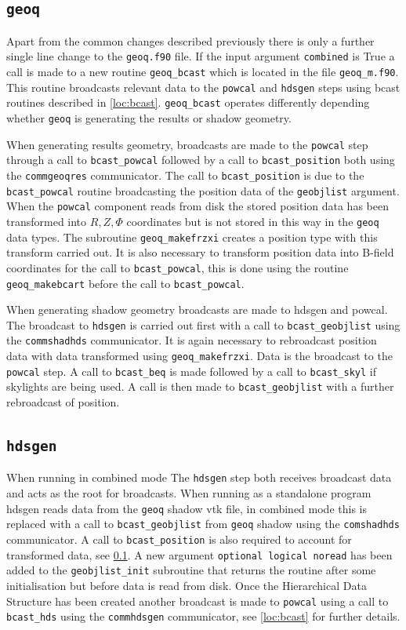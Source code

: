 \subsection{\tt geoq}
\label{loc:geoq}
Apart from the common changes described previously there is only a further single line change to the {\tt geoq.f90} file. If the input argument {\tt combined} is True a call is made to a new routine {\tt geoq\_bcast} which is located in the file {\tt geoq\_m.f90}. This routine broadcasts relevant data to the {\tt powcal} and {\tt hdsgen} steps using bcast routines described in \ref{loc:bcast}. {\tt geoq\_bcast} operates differently depending whether {\tt geoq} is generating the results or shadow geometry.

When generating results geometry, broadcasts are made to the {\tt powcal} step through a call to {\tt bcast\_powcal} followed by a call to {\tt bcast\_position} both using the {\tt commgeoqres} communicator. The call to {\tt bcast\_position} is due to the {\tt bcast\_powcal} routine broadcasting the position data of the {\tt geobjlist} argument. When the {\tt powcal} component reads from disk the stored position data has been transformed into $R,Z,\Phi$ coordinates but is not stored in this way in the {\tt geoq} data types. The subroutine {\tt geoq\_makefrzxi} creates a position type with this transform carried out. It is also necessary to transform position data into B-field coordinates for the call to {\tt bcast\_powcal}, this is done using the routine {\tt geoq\_makebcart} before the call to {\tt bcast\_powcal}.

When generating shadow geometry broadcasts are made to hdsgen and powcal. The broadcast to {\tt hdsgen} is carried out first with a call to {\tt bcast\_geobjlist} using the {\tt commshadhds} communicator. It is again necessary to rebroadcast position data with data transformed using {\tt geoq\_makefrzxi}. Data is the broadcast to the {\tt powcal} step. A call to {\tt bcast\_beq} is made followed by a call to {\tt bcast\_skyl} if skylights are being used. A call is then made to {\tt bcast\_geobjlist} with a further rebroadcast of position.


\subsection{\tt hdsgen}
When running in combined mode The {\tt hdsgen} step both receives broadcast data and acts as the root for broadcasts. When running as a standalone program hdsgen reads data from the {\tt geoq} shadow vtk file, in combined mode this is replaced with a call to {\tt bcast\_geobjlist} from {\tt geoq} shadow using the {\tt comshadhds} communicator. A call to {\tt bcast\_position} is also required to account for transformed data, see \ref{loc:geoq}. A new argument {\tt optional logical noread} has been added to the {\tt geobjlist\_init} subroutine that returns the routine after some initialisation but before data is read from disk. Once the Hierarchical Data Structure has been created another broadcast is made to {\tt powcal} using a call to {\tt bcast\_hds} using the {\tt commhdsgen} communicator, see \ref{loc:bcast} for further details.

